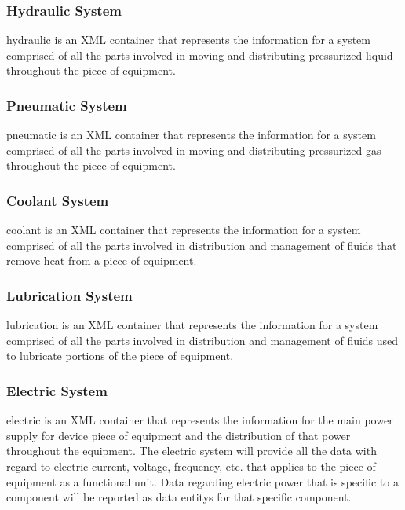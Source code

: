 \documentclass{mtconnect}	%
\begin{document}
\subsubsection{Hydraulic System}

\gls{hydraulic} is an XML container that represents the information for a system comprised of all the parts involved in moving and distributing pressurized liquid throughout the piece of equipment.

\subsubsection{Pneumatic System}

\gls{pneumatic} is an XML container that represents the information for a system comprised of all the parts involved in moving and distributing pressurized gas throughout the piece of equipment. 

\subsubsection{Coolant System}

\gls{coolant} is an XML container that represents the information for a system comprised of all the parts involved in distribution and management of fluids that remove heat from a piece of equipment.

\subsubsection{Lubrication System}

\gls{lubrication} is an XML container that represents the information for a system comprised of all the parts involved in distribution and management of fluids used to lubricate portions of the piece of equipment.

\subsubsection{Electric System}

\gls{electric} is an XML container that represents the information for the main power supply for device piece of equipment and the distribution of that power throughout the equipment.  The electric system will provide all the data with regard to electric current, voltage, frequency, etc. that applies to the piece of equipment as a functional unit.   Data regarding electric power that is specific to a \gls{component} will be reported as \glspl{data entity} for that specific \gls{component}.
\end{document}
